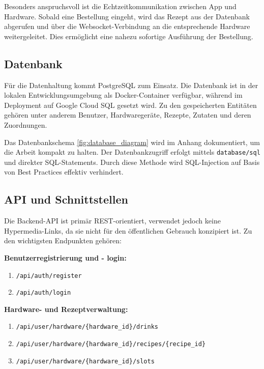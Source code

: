 Besonders anspruchsvoll ist die Echtzeitkommunikation zwischen App und Hardware. Sobald eine 
Bestellung eingeht, wird das Rezept aus der Datenbank abgerufen und über die Websocket-Verbindung 
an die entsprechende Hardware weitergeleitet. Dies ermöglicht eine nahezu sofortige Ausführung der 
Bestellung.

\subsection{Datenbank}

Für die Datenhaltung kommt PostgreSQL zum Einsatz. Die Datenbank ist in der lokalen 
Entwicklungsumgebung als Docker-Container verfügbar, während im Deployment auf Google Cloud SQL 
gesetzt wird. Zu den gespeicherten Entitäten gehören unter anderem Benutzer, Hardwaregeräte, 
Rezepte, Zutaten und deren Zuordnungen.

Das Datenbankschema \ref{fig:database_diagram} wird im Anhang dokumentiert, um die Arbeit kompakt zu 
halten. Der Datenbankzugriff erfolgt mittels \texttt{database/sql} und direkter SQL-Statements. 
Durch diese Methode wird SQL-Injection auf Basis von Best Practices effektiv verhindert.

\subsection{API und 
Schnittstellen}

Die Backend-API ist primär REST-orientiert, verwendet jedoch keine Hypermedia-Links, da sie nicht 
für den öffentlichen Gebrauch konzipiert ist. Zu den wichtigsten Endpunkten gehören:

\vspace{0.5cm}
\textbf{Benutzerregistrierung und - login:}
\begin{enumerate}
  \item \texttt{/api/auth/register}
  \item \texttt{/api/auth/login}
\end{enumerate}

\vspace{0.5cm}
\textbf{Hardware- und Rezeptverwaltung:}
\begin{enumerate}
	\item \texttt{/api/user/hardware/\{hardware\_id\}/drinks}
	\item \texttt{/api/user/hardware/\{hardware\_id\}/recipes/\{recipe\_id\}}
	\item \texttt{/api/user/hardware/\{hardware\_id\}/slots}
\end{enumerate}

